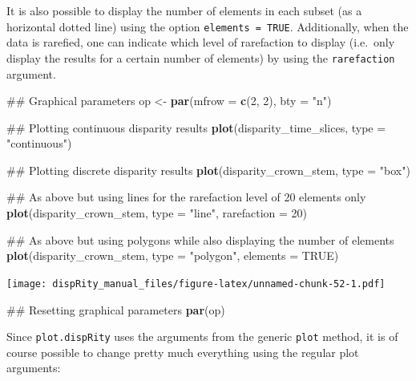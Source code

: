 \documentclass[]{book}
\newenvironment{Shaded}{\begin{snugshade}}{\end{snugshade}}
\newcommand{\KeywordTok}[1]{\textcolor[rgb]{0.13,0.29,0.53}{\textbf{#1}}}
\newcommand{\DataTypeTok}[1]{\textcolor[rgb]{0.13,0.29,0.53}{#1}}
\newcommand{\DecValTok}[1]{\textcolor[rgb]{0.00,0.00,0.81}{#1}}
\newcommand{\StringTok}[1]{\textcolor[rgb]{0.31,0.60,0.02}{#1}}
\newcommand{\OtherTok}[1]{\textcolor[rgb]{0.56,0.35,0.01}{#1}}
\newcommand{\NormalTok}[1]{#1}
\theoremstyle{definition}
\theoremstyle{definition}
\theoremstyle{remark}
\begin{document}
It is also possible to display the number of elements in each subset (as
a horizontal dotted line) using the option \texttt{elements\ =\ TRUE}.
Additionally, when the data is rarefied, one can indicate which level of
rarefaction to display (i.e.~only display the results for a certain
number of elements) by using the \texttt{rarefaction} argument.

\begin{Shaded}
\begin{Highlighting}[]
\NormalTok{## Graphical parameters}
\NormalTok{op <-}\StringTok{ }\KeywordTok{par}\NormalTok{(}\DataTypeTok{mfrow =} \KeywordTok{c}\NormalTok{(}\DecValTok{2}\NormalTok{, }\DecValTok{2}\NormalTok{), }\DataTypeTok{bty =} \StringTok{"n"}\NormalTok{)}

\NormalTok{## Plotting continuous disparity results}
\KeywordTok{plot}\NormalTok{(disparity_time_slices, }\DataTypeTok{type =} \StringTok{"continuous"}\NormalTok{)}

\NormalTok{## Plotting discrete disparity results}
\KeywordTok{plot}\NormalTok{(disparity_crown_stem, }\DataTypeTok{type =} \StringTok{"box"}\NormalTok{)}

\NormalTok{## As above but using lines for the rarefaction level of 20 elements only}
\KeywordTok{plot}\NormalTok{(disparity_crown_stem, }\DataTypeTok{type =} \StringTok{"line"}\NormalTok{, }\DataTypeTok{rarefaction =} \DecValTok{20}\NormalTok{)}

\NormalTok{## As above but using polygons while also displaying the number of elements}
\KeywordTok{plot}\NormalTok{(disparity_crown_stem, }\DataTypeTok{type =} \StringTok{"polygon"}\NormalTok{, }\DataTypeTok{elements =} \OtherTok{TRUE}\NormalTok{)}
\end{Highlighting}
\end{Shaded}

\texttt{[image: dispRity\_manual\_files/figure-latex/unnamed-chunk-52-1.pdf]}

\begin{Shaded}
\begin{Highlighting}[]
\NormalTok{## Resetting graphical parameters}
\KeywordTok{par}\NormalTok{(op)}
\end{Highlighting}
\end{Shaded}

Since \texttt{plot.dispRity} uses the arguments from the generic
\texttt{plot} method, it is of course possible to change pretty much
everything using the regular plot arguments:
\end{document}
